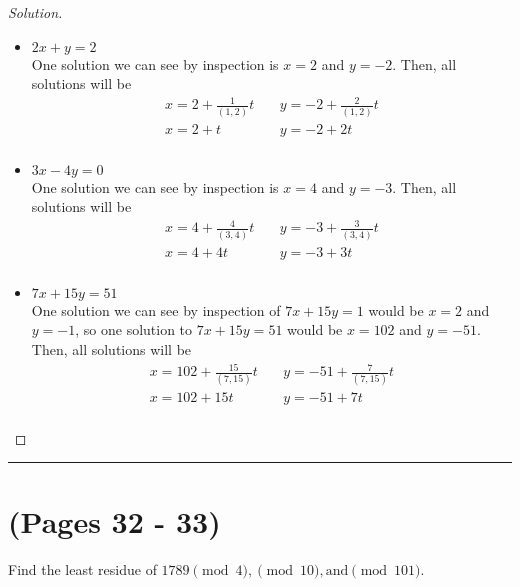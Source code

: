 \documentclass[11pt]{article}
\newcommand{\bline}{\noindent\rule[0.5ex]{\linewidth}{1pt}}
\newenvironment{problem}[2][Problem]{\begin{trivlist}
\item[\hskip \labelsep {\bfseries #1}\hskip \labelsep {\bfseries #2.}]}{\end{trivlist}}
\newenvironment{solution}
  {\renewcommand\qedsymbol{$~$}\begin{proof}[Solution]$ $\par\nobreak\ignorespaces}
  {\end{proof}}
\begin{document}
\begin{solution}
  \begin{itemize}
    \item [(a)] $2x+y=2$ \\
          One solution we can see by inspection is $x=2$ and $y=-2$. Then, all solutions will be
          \begin{align*}
            x = 2 + \frac{1}{(1,2)}t & ~ & y = -2 + \frac{2}{(1,2)}t \\
            x = 2 + t                & ~ & y = -2+ 2t                \\
          \end{align*}
    \item [(b)] $3x-4y=0$ \\
          One solution we can see by inspection is $x=4$ and $y=-3$. Then, all solutions will be
          \begin{align*}
            x = 4 + \frac{4}{(3,4)}t & ~ & y = -3 + \frac{3}{(3,4)}t \\
            x = 4 + 4t               & ~ & y = -3 + 3t               \\
          \end{align*}
    \item [(c)] $7x+15y=51$ \\
          One solution we can see by inspection of $7x+15y=1$ would be $x=2$ and $y=-1$, so one solution to $7x+15y=51$ would be $x=102$ and $y=-51$. Then, all solutions will be
          \begin{align*}
            x = 102 + \frac{15}{(7,15)}t & ~ & y = -51 + \frac{7}{(7,15)}t \\
            x = 102 + 15t                & ~ & y = -51 + 7t                \\
          \end{align*}

  \end{itemize}
\end{solution}


\bline
\section{(Pages 32 - 33)}

\begin{problem}{2}
Find the least residue of $1789 \pmod{4},\pmod{10},\text{and} \pmod{101}$.
\end{problem}
\end{document}

